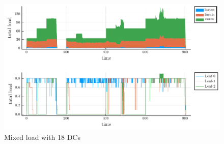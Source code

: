 


\begin{figure}[tb]
  \centering
  \includegraphics[width=\columnwidth]{18nodes.pdf}
  \vspace{-2.0ex}
  \caption{Mixed load with 18 DCs}
  \label{fig:18nodes}
\end{figure}


